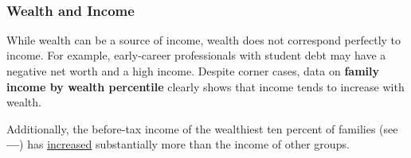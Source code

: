 \begin{minipage}{0.28\textwidth}  
\small 
\end{minipage}\hspace{5mm}
\begin{minipage}{0.44\textwidth}
\\
\end{minipage}
\vspace{3mm}

\subsubsection*{Wealth and Income}
\begin{minipage}{0.76\textwidth}
\small While wealth can be a source of income, wealth does not correspond perfectly to income. For example, early-career professionals with student debt may have a negative net worth and a high income. Despite corner cases, data on \textbf{family income by wealth percentile} clearly shows that income tends to increase with wealth. 

Additionally, the before-tax income of the wealthiest ten percent of families (see {\color{blue!80!cyan!80!black}\textbf{---}}) has \href{https://www.federalreserve.gov/econres/scf/dataviz/scf/chart/#series:Before_Tax_Income;demographic:nwcat;population:1,2,3,4,5;units:median}{increased} substantially more than the income of other groups.  
\end{minipage}
\vspace{1mm}

